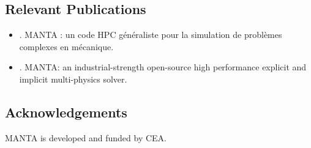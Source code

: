 \subsection{Relevant Publications}
\label{sec:MANTA:publications}
\begin{itemize}
   \item {}. MANTA : un code HPC généraliste pour la simulation de problèmes complexes en mécanique.
   \item {}. MANTA: an industrial-strength open-source high performance explicit and implicit multi-physics solver.
\end{itemize}


\subsection{Acknowledgements}
\label{sec::MANTA:acknowledgements}

MANTA is developed and funded by CEA.


